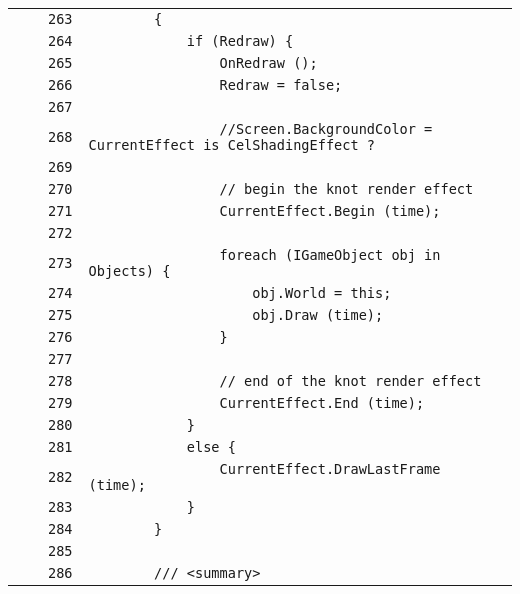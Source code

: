 \documentclass[a4paper,10pt]{article}
\begin{document}
\begin{longtable}[l]{lrrl}
\cellcolor{gray} &  & \verb~263~ & \verb~        {~\\
\cellcolor{gray} &  & \verb~264~ & \verb~            if (Redraw) {~\\
\cellcolor{gray} &  & \verb~265~ & \verb~                OnRedraw ();~\\
\cellcolor{gray} &  & \verb~266~ & \verb~                Redraw = false;~\\
\cellcolor{gray} &  & \verb~267~ & \verb~~\\
\cellcolor{gray} &  & \verb~268~ & \verb~                //Screen.BackgroundColor = CurrentEffect is CelShadingEffect ?~\\
\cellcolor{gray} &  & \verb~269~ & \verb~~\\
\cellcolor{gray} &  & \verb~270~ & \verb~                // begin the knot render effect~\\
\cellcolor{gray} &  & \verb~271~ & \verb~                CurrentEffect.Begin (time);~\\
\cellcolor{gray} &  & \verb~272~ & \verb~~\\
\cellcolor{gray} &  & \verb~273~ & \verb~                foreach (IGameObject obj in Objects) {~\\
\cellcolor{gray} &  & \verb~274~ & \verb~                    obj.World = this;~\\
\cellcolor{gray} &  & \verb~275~ & \verb~                    obj.Draw (time);~\\
\cellcolor{gray} &  & \verb~276~ & \verb~                }~\\
\cellcolor{gray} &  & \verb~277~ & \verb~~\\
\cellcolor{gray} &  & \verb~278~ & \verb~                // end of the knot render effect~\\
\cellcolor{gray} &  & \verb~279~ & \verb~                CurrentEffect.End (time);~\\
\cellcolor{gray} &  & \verb~280~ & \verb~            }~\\
\cellcolor{gray} &  & \verb~281~ & \verb~            else {~\\
\cellcolor{gray} &  & \verb~282~ & \verb~                CurrentEffect.DrawLastFrame (time);~\\
\cellcolor{gray} &  & \verb~283~ & \verb~            }~\\
\cellcolor{gray} &  & \verb~284~ & \verb~        }~\\
\cellcolor{gray} &  & \verb~285~ & \verb~~\\
\cellcolor{gray} &  & \verb~286~ & \verb~        /// <summary>~\\

\end{longtable}
\end{document}
